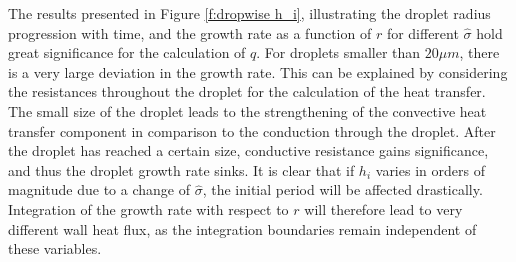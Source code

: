 \documentclass[12pt]{article}
\numberwithin{equation}{section}
\begin{document}
The results presented in Figure \ref{f:dropwise h_i}, illustrating the droplet radius progression with time, and the growth rate as a function of $r$ for different $\hat{\sigma}$ hold great significance for the calculation of $q$. For droplets smaller than $20\mu m$, there is a very large deviation in the growth rate. This can be explained by considering the resistances throughout the droplet for the calculation of the heat transfer. The small size of the droplet leads to the strengthening of the convective heat transfer component in comparison to the conduction through the droplet. After the droplet has reached a certain size, conductive resistance gains significance, and thus the droplet growth rate sinks. It is clear that if $h_{i}$ varies in orders of magnitude due to a change of $\hat{\sigma}$, the initial period will be affected drastically. Integration of the growth rate with respect to $r$ will therefore lead to very different wall heat flux, as the integration boundaries remain independent of these variables. 
\end{document}

